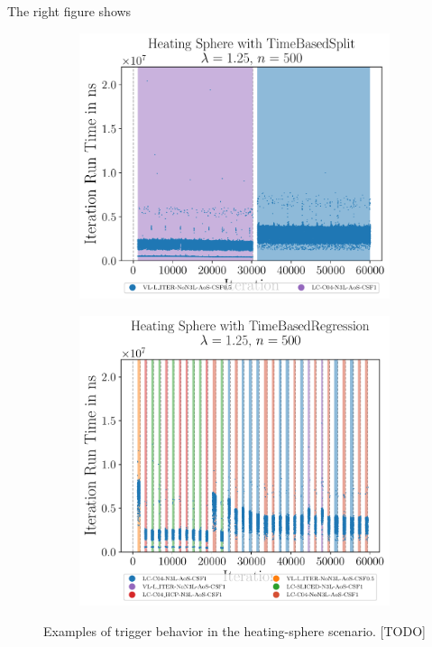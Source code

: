 The right figure shows


\begin{figure}[htpb]
	\begin{subfigure}[c]{0.5\textwidth}
		\centering
		\includegraphics[width=\textwidth]{./Figures/plots/heating-sphere_configs_good.pdf}
	\end{subfigure}
	\begin{subfigure}[c]{0.5\textwidth}
		\centering
		\includegraphics[width=\textwidth]{./Figures/plots/heating-sphere_configs_bad.pdf}
	\end{subfigure}
	\caption{Examples of trigger behavior in the heating-sphere scenario. [TODO]}
	\label{fig:hs_trigger_behavior}
\end{figure}

